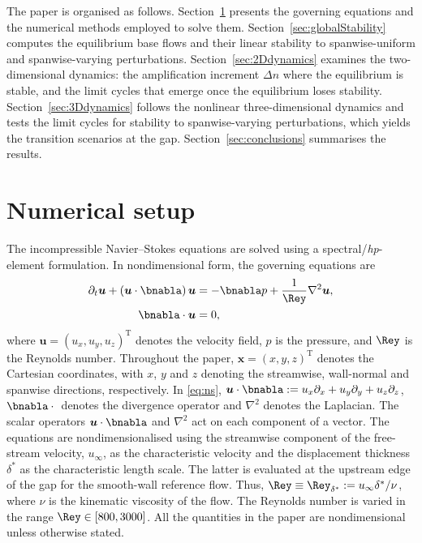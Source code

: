 \documentclass[lineno]{jfm}
\newcommand\dstar{{\delta^*}} %
\begin{document}
The paper is organised as follows. Section~\ref{sec:numericalSetup} presents the governing equations and the numerical methods employed to solve them. Section~\ref{sec:globalStability} computes the equilibrium base flows and their linear stability to spanwise-uniform and spanwise-varying perturbations. Section~\ref{sec:2Ddynamics} examines the two-dimensional dynamics: the amplification increment $\Delta n$ where the equilibrium is stable, and the limit cycles that emerge once the equilibrium loses stability. Section~\ref{sec:3Ddynamics} follows the nonlinear three-dimensional dynamics and tests the limit cycles for stability to spanwise-varying perturbations, which yields the transition scenarios at the gap. Section~\ref{sec:conclusions} summarises the results.

\section{Numerical setup}\label{sec:numericalSetup}
The incompressible Navier--Stokes equations are solved using a spectral/\textit{hp}-element formulation. In nondimensional form, the governing equations are
\begin{equation}\label{eq:ns}
	\begin{aligned}
		\partial_t \boldsymbol{u} + (\boldsymbol{u}\cdot\bnabla)\,\boldsymbol{u} & = -\bnabla p + \frac{1}{\Rey} \nabla^2 \boldsymbol{u}, \\
		\bnabla \cdot \boldsymbol{u}                                       & = 0,
	\end{aligned}
\end{equation}
where $\boldsymbol{u}={(u_x,u_y,u_z)}^\mathrm{T}$ denotes the velocity field, $p$ is the pressure, and $\Rey$ is the Reynolds number. Throughout the paper, $\boldsymbol{x}={(x,y,z)}^\mathrm{T}$ denotes the Cartesian coordinates, with $x$, $y$ and $z$ denoting the streamwise, wall-normal and spanwise directions, respectively. In \eqref{eq:ns}, $\boldsymbol{u}\cdot\bnabla:=u_x\partial_x+u_y\partial_y+u_z\partial_z$, $\bnabla\cdot{}$ denotes the divergence operator and $\nabla^2$ denotes the Laplacian. The scalar operators $\boldsymbol{u}\cdot\bnabla$ and $\nabla^2$ act on each component of a vector. The equations are nondimensionalised using the streamwise component of the free-stream velocity, $u_\infty$, as the characteristic velocity and the displacement thickness $\dstar$ as the characteristic length scale. The latter is evaluated at the upstream edge of the gap for the smooth-wall reference flow. Thus,
$
	\Rey \equiv \Rey_\dstar := u_\infty \dstar/\nu
$,
where $\nu$ is the kinematic viscosity of the flow. The Reynolds number is varied in the range $\Rey \in [800,3000]$. All the quantities in the paper are nondimensional unless otherwise stated.
\end{document}
